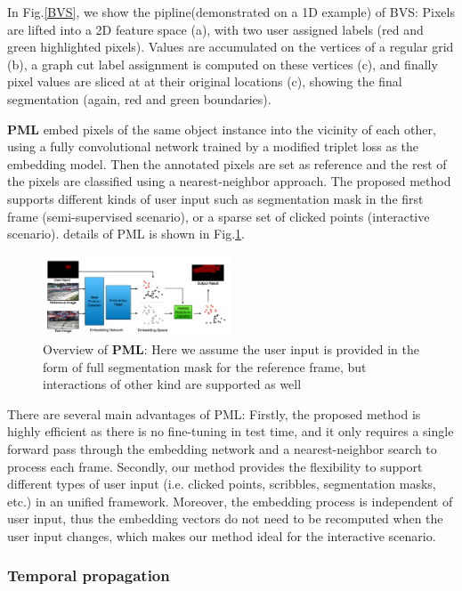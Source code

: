 In Fig.\ref{BVS}, we show the pipline(demonstrated on a 1D example) of BVS: Pixels are lifted into a 2D feature space (a), with two user assigned labels (red and green highlighted pixels). Values are accumulated on the vertices of a regular grid (b), a graph cut label assignment is computed on these vertices (c), and finally pixel values are sliced at at their original locations (c), showing the final segmentation (again, red and green boundaries).


\textbf{PML}\cite{PML} embed pixels of the same object instance into the vicinity of each other, using a fully convolutional network trained by a modified triplet loss as the embedding model. Then the annotated pixels are set as reference and the rest of the pixels are classified using a nearest-neighbor approach. The proposed method supports different kinds of user input such as segmentation mask in the first frame (semi-supervised scenario), or a sparse set of clicked points (interactive scenario). details of PML is shown in Fig.\ref{PML}.

\begin{figure}[ht]
    \centering
    \includegraphics[width=0.5\textwidth]{./figure/PML.png}
    \caption{Overview of \textbf{PML}: Here we assume the user input is provided in the form of full segmentation mask for the reference frame, but interactions of other kind are supported as well}
    \label{PML}
\end{figure}

There are several main advantages of PML: Firstly, the proposed method is highly efficient as there is no fine-tuning in test time, and it only requires a single forward pass through the embedding network and a nearest-neighbor search to process each frame. Secondly, our method provides the ﬂexibility to support different types of user input (i.e. clicked points, scribbles, segmentation masks, etc.) in an unified framework. Moreover, the embedding process is independent of user input, thus the embedding vectors do not need to be recomputed when the user input changes, which makes our method ideal for the interactive scenario.

\subsubsection{Temporal propagation}

